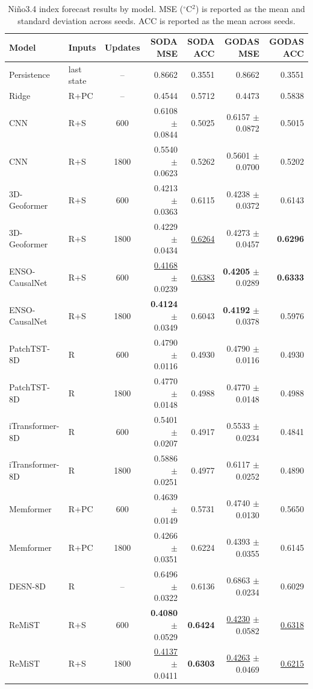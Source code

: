 \begin{table}[!t]
\centering\footnotesize
\caption{Ni\~no3.4 index forecast results by model. MSE ($^\circ$C$^2$) is reported as the mean and standard deviation across seeds. ACC is reported as the mean across seeds.}
\label{tab:overall}
\begin{tabular}{llcrrrr}
\toprule
Model & Inputs & Updates & SODA MSE & SODA ACC & GODAS MSE & GODAS ACC \\
\midrule
Persistence & last state & -- & 0.8662 & 0.3551 & 0.8662 & 0.3551 \\
Ridge & R+PC & -- & 0.4544 & 0.5712 & 0.4473 & 0.5838 \\
CNN & R+S & 600 & 0.6108 $\pm$ 0.0844 & 0.5025 & 0.6157 $\pm$ 0.0872 & 0.5015 \\
CNN & R+S & 1800 & 0.5540 $\pm$ 0.0623 & 0.5262 & 0.5601 $\pm$ 0.0700 & 0.5202 \\
3D-Geoformer & R+S & 600 & 0.4213 $\pm$ 0.0363 & 0.6115 & 0.4238 $\pm$ 0.0372 & 0.6143 \\
3D-Geoformer & R+S & 1800 & 0.4229 $\pm$ 0.0434 & \underline{0.6264} & 0.4273 $\pm$ 0.0457 & \textbf{0.6296} \\
ENSO-CausalNet & R+S & 600 & \underline{0.4168} $\pm$ 0.0239 & \underline{0.6383} & \textbf{0.4205} $\pm$ 0.0289 & \textbf{0.6333} \\
ENSO-CausalNet & R+S & 1800 & \textbf{0.4124} $\pm$ 0.0349 & 0.6043 & \textbf{0.4192} $\pm$ 0.0378 & 0.5976 \\
PatchTST-8D & R & 600 & 0.4790 $\pm$ 0.0116 & 0.4930 & 0.4790 $\pm$ 0.0116 & 0.4930 \\
PatchTST-8D & R & 1800 & 0.4770 $\pm$ 0.0148 & 0.4988 & 0.4770 $\pm$ 0.0148 & 0.4988 \\
iTransformer-8D & R & 600 & 0.5401 $\pm$ 0.0207 & 0.4917 & 0.5533 $\pm$ 0.0234 & 0.4841 \\
iTransformer-8D & R & 1800 & 0.5886 $\pm$ 0.0251 & 0.4977 & 0.6117 $\pm$ 0.0252 & 0.4890 \\
Memformer & R+PC & 600 & 0.4639 $\pm$ 0.0149 & 0.5731 & 0.4740 $\pm$ 0.0130 & 0.5650 \\
Memformer & R+PC & 1800 & 0.4266 $\pm$ 0.0351 & 0.6224 & 0.4393 $\pm$ 0.0355 & 0.6145 \\
DESN-8D & R & -- & 0.6496 $\pm$ 0.0322 & 0.6136 & 0.6863 $\pm$ 0.0234 & 0.6029 \\
ReMiST & R+S & 600 & \textbf{0.4080} $\pm$ 0.0529 & \textbf{0.6424} & \underline{0.4230} $\pm$ 0.0582 & \underline{0.6318} \\
ReMiST & R+S & 1800 & \underline{0.4137} $\pm$ 0.0411 & \textbf{0.6303} & \underline{0.4263} $\pm$ 0.0469 & \underline{0.6215} \\
\bottomrule
\end{tabular}
\end{table}
